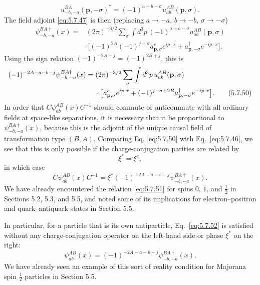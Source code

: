 \begin{equation}
u^{BA}_{-b,-a}(\mathbf p,-\sigma)^*=(-1)^{a+b-\sigma}
u^{AB}_{ab}(\mathbf p,\sigma).
\tag{5.7.49}\label{eq:5.7.49}
\end{equation}
The field adjoint \eqref{eq:5.7.47} is then (replacing
$a\to-a$, $b\to-b$, $\sigma\to-\sigma$)
\begin{align*}
\psi^{BA\dagger}_{-b,-a}(x)={}&(2\pi)^{-3/2}\sum_\sigma\int d^3p\,
(-1)^{a+b-\sigma}u^{AB}_{ab}(\mathbf p,\sigma)
\\
&\cdot\bigl[(-1)^{2A}(-1)^{j+\sigma}a^c_{\mathbf p,\sigma}e^{ip\cdot x}
+a^\dagger_{\mathbf p,-\sigma}e^{-ip\cdot x}\bigr].
\end{align*}
Using the sign relation $(-1)^{-2A-j}=(-1)^{2B+j}$, this is
\begin{align}
(-1)^{-2A-a-b-j}\psi^{BA\dagger}_{-b,-a}(x)
={}&(2\pi)^{-3/2}\sum_\sigma\int d^3p\,u^{AB}_{ab}(\mathbf p,\sigma)
\notag\\
&\cdot\bigl[a^c_{\mathbf p,\sigma}e^{ip\cdot x}
+(-1)^{j-\sigma+2B}a^\dagger_{\mathbf p,-\sigma}e^{-ip\cdot x}\bigr].
\tag{5.7.50}\label{eq:5.7.50}
\end{align}
In order that $C\psi^{AB}_{ab}(x)C^{-1}$ should commute or anticommute with
all ordinary fields at space-like separations, it is necessary that it be
proportional to $\psi^{BA\dagger}_{-b,-a}(x)$, because this is the adjoint of
the unique causal field of transformation type $(B,A)$. Comparing Eq.
\eqref{eq:5.7.50} with Eq.~\eqref{eq:5.7.46}, we see that this is only possible if the
charge-conjugation parities are related by
\begin{equation}
\xi^*=\xi^c,
\tag{5.7.51}\label{eq:5.7.51}
\end{equation}
in which case
\begin{equation}
C\psi^{AB}_{ab}(x)C^{-1}=
\xi^*(-1)^{-2A-a-b-j}\psi^{BA\dagger}_{-b,-a}(x).
\tag{5.7.52}\label{eq:5.7.52}
\end{equation}
We have already encountered the relation \eqref{eq:5.7.51} for spins $0$, $1$, and
$\tfrac12$ in Sections 5.2, 5.3, and 5.5, and noted some of its implications
for electron--positron and quark--antiquark states in Section 5.5.

In particular, for a particle that is its own antiparticle, Eq.~\eqref{eq:5.7.52} is
satisfied without any charge-conjugation operator on the left-hand side or
phase $\xi^*$ on the right:
\begin{equation}
\psi^{AB}_{ab}(x)=(-1)^{-2A-a-b-j}\psi^{BA\dagger}_{-b,-a}(x).
\tag{5.7.53}\label{eq:5.7.53}
\end{equation}
We have already seen an example of this sort of reality condition for Majorana
spin $\tfrac12$ particles in Section 5.5.

